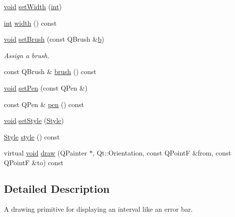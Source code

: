 \begin{DoxyCompactItemize}
\hyperlink{group___u_a_v_objects_plugin_ga444cf2ff3f0ecbe028adce838d373f5c}{void} \hyperlink{class_qwt_interval_symbol_adfacdeb67c9e6d194df4d3d627de23eb}{set\-Width} (\hyperlink{ioapi_8h_a787fa3cf048117ba7123753c1e74fcd6}{int})
\item 
\hyperlink{ioapi_8h_a787fa3cf048117ba7123753c1e74fcd6}{int} \hyperlink{class_qwt_interval_symbol_a7f0bb9488778d9054932a5c072daecdc}{width} () const 
\item 
\hyperlink{group___u_a_v_objects_plugin_ga444cf2ff3f0ecbe028adce838d373f5c}{void} \hyperlink{class_qwt_interval_symbol_a2bf63ba6d8051ad890787b4762ae8b9a}{set\-Brush} (const Q\-Brush \&\hyperlink{glext_8h_a6eba317e3cf44d6d26c04a5a8f197dcb}{b})
\begin{DoxyCompactList}\small\item\em Assign a brush. \end{DoxyCompactList}\item 
const Q\-Brush \& \hyperlink{class_qwt_interval_symbol_a925cdf560cbeb857ad4c2176b552aacc}{brush} () const 
\item 
\hyperlink{group___u_a_v_objects_plugin_ga444cf2ff3f0ecbe028adce838d373f5c}{void} \hyperlink{class_qwt_interval_symbol_af40ddcffa51daf70c9f44f18b33a9ee2}{set\-Pen} (const Q\-Pen \&)
\item 
const Q\-Pen \& \hyperlink{class_qwt_interval_symbol_a5945eb2b656f12451d02721b9068441d}{pen} () const 
\item 
\hyperlink{group___u_a_v_objects_plugin_ga444cf2ff3f0ecbe028adce838d373f5c}{void} \hyperlink{class_qwt_interval_symbol_a24d64169355cc200a49af15c08fe93fc}{set\-Style} (\hyperlink{class_qwt_interval_symbol_a8fe960fd50b3ad08765ef8bb632ad77e}{Style})
\item 
\hyperlink{class_qwt_interval_symbol_a8fe960fd50b3ad08765ef8bb632ad77e}{Style} \hyperlink{class_qwt_interval_symbol_a301b219e05ee54fd49dafd969bc4ddd7}{style} () const 
\item 
virtual \hyperlink{group___u_a_v_objects_plugin_ga444cf2ff3f0ecbe028adce838d373f5c}{void} \hyperlink{class_qwt_interval_symbol_aa13043e1d35361d8d259717a6579dadc}{draw} (Q\-Painter $\ast$, Qt\-::\-Orientation, const Q\-Point\-F \&from, const Q\-Point\-F \&to) const 
\end{DoxyCompactItemize}


\subsection{Detailed Description}
A drawing primitive for displaying an interval like an error bar. 

